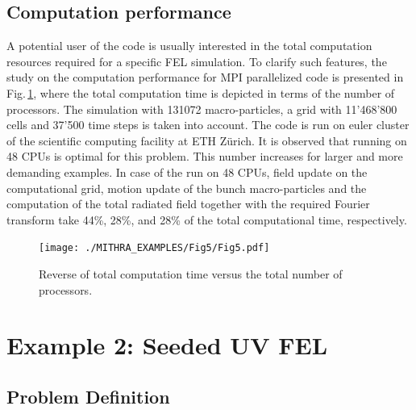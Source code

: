 \subsection{Computation performance}

A potential user of the code is usually interested in the total computation resources required for a specific FEL simulation.
%
To clarify such features, the study on the computation performance for MPI parallelized code is presented in Fig.\,\ref{computationPerformance}, where the total computation time is depicted in terms of the number of processors.
%
The simulation with 131072 macro-particles, a grid with 11'468'800 cells and 37'500 time steps is taken into account.
%
The code is run on euler cluster of the scientific computing facility at ETH Z\"urich.
%
It is observed that running on 48 CPUs is optimal for this problem.
%
This number increases for larger and more demanding examples.
%
In case of the run on 48 CPUs, field update on the computational grid, motion update of the bunch macro-particles and the computation of the total radiated field together with the required Fourier transform take 44\%, 28\%, and 28\% of the total computational time, respectively.
%
\begin{figure}
	\centering
	\texttt{[image: ./MITHRA\_EXAMPLES/Fig5/Fig5.pdf]}
	\caption{Reverse of total computation time versus the total number of processors.}
	\label{computationPerformance}
\end{figure}

\section{Example 2: Seeded UV FEL}

\subsection{Problem Definition}

